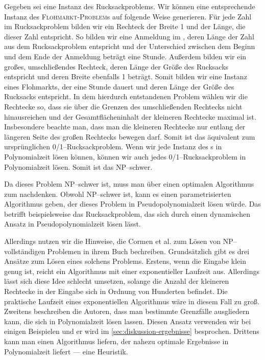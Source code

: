 Gegeben sei eine Instanz des Rucksackproblems.
Wir können eine entsprechende Instanz des \textsc{Floh\-markt-\-Pro\-blem}s auf folgende Weise generieren.
Für jede Zahl im Rucksackproblem bilden wir ein Rechteck der Breite 1 und der Länge, die 
dieser Zahl entspricht.
So bilden wir eine Anmeldung im \fp{}, deren Länge der
Zahl aus dem Rucksackproblem entspricht und der Unterschied zwischen
dem Beginn und dem Ende der Anmeldung beträgt eine Stunde.
Außerdem bilden wir ein großes, umschließendes Rechteck, deren Länge der Größe des Rucksacks entspricht
und deren Breite ebenfalls 1 beträgt.
Somit bilden wir eine Instanz eines Flohmarkts, der eine Stunde dauert und deren 
Länge der Größe des Rucksacks entspricht.
In dem hierdurch entstandenen Problem wählen wir die Rechtecke so, 
dass sie über die Grenzen des umschließenden Rechtecks nicht hinausreichen
und der Gesamtflächeninhalt der kleineren Rechtecke maximal ist. 
Insbesondere beachte man, dass man die kleineren Rechtecke nur entlang der längeren
Seite des großen Rechtecks bewegen darf.
Somit ist das \fp{} äquivalent zum ursprünglichen 0/1--Rucksackproblem.
Wenn wir jede Instanz des \fp s in Polynomialzeit lösen können,
können wir auch jedes 0/1--Rucksackproblem in Polynomialzeit lösen.
Somit ist das \fp{} NP--schwer.


Da dieses Problem NP--schwer ist, muss man über einen optimalen Algorithmus zum
\fp{} nachdenken. 
Obwohl \fp{} NP--schwer ist, kann es einen parametrisierten Algorithmus geben,
der dieses Problem in Pseudopolynomialzeit lösen würde.\cite{parametrized}
Das betrifft beispielsweise das Rucksackproblem, das sich durch einen dynamischen 
Ansatz in Pseudopolynomialzeit lösen lässt.

Allerdings nutzen wir die Hinweise, die Cormen et al. zum Lösen von NP--vollständigen Problemen
in ihrem Buch bechreiben. Grundsätzlich gibt es drei Ansätze zum Lösen eines
solchens Problems.\cite[S.~1106]{cormen}
Erstens, wenn die Eingabe klein genug ist, reicht ein 
Algorithmus mit einer exponentieller Laufzeit aus.
Allerdings lässt sich diese Idee schlecht umsetzen,
solange die Anzahl der kleineren Rechtecke in der Eingabe sich in Ordnung von Hunderten befindet.
Die praktische Laufzeit eines exponentiellen Algorithmus wäre in diesem Fall zu groß.
Zweitens beschreiben die Autoren,
dass man bestimmte Grenzfälle ausgliedern kann, die sich in Polynomialzeit lösen lassen.
Diesen Ansatz verwenden wir bei einigen Beispielen und er wird im \cref{sec:diskussion-ergebnisse}
besprochen.
Drittens kann man einen Algorithmus liefern, der nahezu optimale Ergebnisse 
in Polynomialzeit liefert --- eine Heuristik. 



